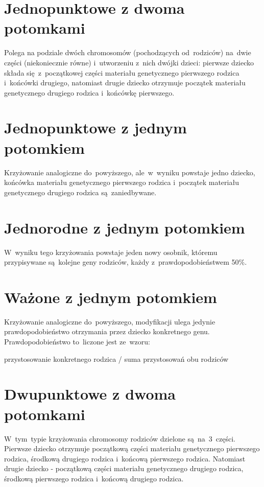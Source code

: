\documentclass[11pt]{aghdpl}
\begin{document}
\section{Jednopunktowe z dwoma potomkami}
\label{sec:jedenDwa}
Polega na podziale dwóch chromosomów (pochodzących od~rodziców) na~dwie części (niekoniecznie równe) i~utworzeniu z~nich 
dwójki dzieci: pierwsze dziecko składa się~z~początkowej części materiału genetycznego pierwszego rodzica i~końcówki drugiego, 
natomiast drugie dziecko otrzymuje początek materiału genetycznego drugiego rodzica i~końcówkę pierwszego.

\section{Jednopunktowe z jednym potomkiem}
\label{sec:jedenJeden}
Krzyżowanie analogiczne do~powyższego, ale~w~wyniku powstaje jedno dziecko, końcówka materiału genetycznego pierwszego 
rodzica i~początek materiału genetycznego drugiego rodzica są~zaniedbywane.

\section{Jednorodne z jednym potomkiem}
\label{sec:uniform}
W~wyniku tego krzyżowania powstaje jeden nowy osobnik, któremu przypisywane są~kolejne geny rodziców, każdy z~prawdopodobieństwem 50\%.

\section{Ważone z jednym potomkiem}
\label{sec:wazone}
Krzyżowanie analogiczne do~powyższego, modyfikacji ulega jedynie prawdopodobieństwo otrzymania przez dziecko konkretnego genu. 
Prawdopodobieństwo to~liczone jest ze~wzoru:
\begin{center}
przystosowanie konkretnego rodzica / suma przystosowań obu rodziców
\end{center}

\section{Dwupunktowe z dwoma potomkami}
\label{sec:dwaDwa}
W~tym~typie krzyżowania chromosomy rodziców dzielone są~na~3~części. Pierwsze dziecko otrzymuje początkową części materiału 
genetycznego pierwszego rodzica, środkową drugiego rodzica i~końcową pierwszego rodzica. Natomiast drugie dziecko - 
początkową części materiału genetycznego drugiego rodzica, środkową pierwszego rodzica i~końcową drugiego rodzica.
\end{document}
